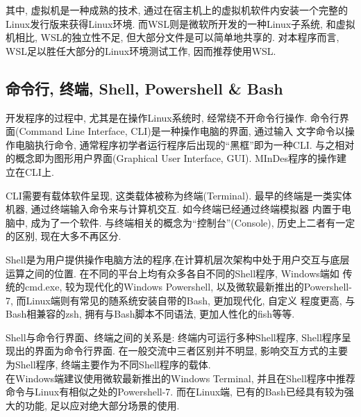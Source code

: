 其中, 虚拟机是一种成熟的技术, 通过在宿主机上的虚拟机软件内安装一个完整的Linux发行版来获得Linux环境. 而WSL则是微软所开发的一种Linux子系统,
和虚拟机相比, WSL的独立性不足, 但大部分文件是可以简单地共享的. 对本程序而言, WSL足以胜任大部分的Linux环境测试工作, 因而推荐使用WSL.

\subsection{命令行, 终端, Shell, Powershell \& Bash}
开发程序的过程中, 尤其是在操作Linux系统时, 经常绕不开命令行操作. 命令行界面(Command Line Interface, CLI)是一种操作电脑的界面, 通过输入
文字命令以操作电脑执行命令, 通常程序初学者运行程序后出现的``黑框''即为一种CLI. 与之相对的概念即为图形用户界面(Graphical User Interface,
GUI). MInDes程序的操作建立在CLI上.

CLI需要有载体软件呈现, 这类载体被称为终端(Terminal). 最早的终端是一类实体机器, 通过终端输入命令来与计算机交互. 如今终端已经通过终端模拟器
内置于电脑中, 成为了一个软件. 与终端相关的概念为``控制台''(Console), 历史上二者有一定的区别, 现在大多不再区分.

Shell是为用户提供操作电脑方法的程序,在计算机层次架构中处于用户交互与底层运算之间的位置. 在不同的平台上均有众多各自不同的Shell程序, Windows端如
传统的cmd.exe, 较为现代化的Windows Powershell, 以及微软最新推出的Powershell-7, 而Linux端则有常见的随系统安装自带的Bash, 更加现代化, 自定义
程度更高, 与Bash相兼容的zsh, 拥有与Bash脚本不同语法, 更加人性化的fish等等.

Shell与命令行界面、终端之间的关系是: 终端内可运行多种Shell程序, Shell程序呈现出的界面为命令行界面. 在一般交流中三者区别并不明显,
影响交互方式的主要为Shell程序, 终端主要作为不同Shell程序的载体. \\在Windows端建议使用微软最新推出的Windows Terminal, 并且在Shell程序中推荐
命令与Linux有相似之处的Powershell-7. 而在Linux端, 已有的Bash已经具有较为强大的功能, 足以应对绝大部分场景的使用.
\endinput